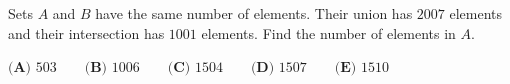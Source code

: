Sets $A$ and $B$ have the same number of elements. Their union has $2007$ elements and their intersection has $1001$ elements. Find the number of elements in $A$.

$\textbf{(A) }503\qquad\textbf{(B) }1006\qquad\textbf{(C) }1504\qquad\textbf{(D) }1507\qquad\textbf{(E) }1510$
